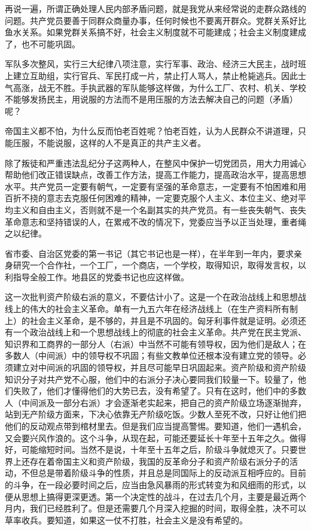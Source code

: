 再说一遍，所谓正确处理人民内部矛盾问题，就是我党从来经常说的走群众路线的问题。共产党员要善于同群众商量办事，任何时候也不要离开群众。党群关系好比鱼水关系。如果党群关系搞不好，社会主义制度就不可能建成；社会主义制度建成了，也不可能巩固。

军队多次整风，实行三大纪律八项注意，实行军事、政治、经济三大民主，战时班上建立互助组，实行官兵、军民打成一片，禁止打人骂人，禁止枪毙逃兵。因此士气高涨，战无不胜。手执武器的军队能够这样做，为什么工厂、农村、机关、学校不能够发扬民主，用说服的方法而不是用压服的方法去解决自己的问题（矛盾）呢？

帝国主义都不怕，为什么反而怕老百姓呢？怕老百姓，认为人民群众不讲道理，只能压服，不能说服，这样的人不是真正的共产主义者。

除了叛徒和严重违法乱纪分子这两种人，在整风中保护一切党团员，用大力用诚心帮助他们改正错误缺点，改善工作方法，提高工作能力，提高政治水平，提高思想水平。共产党员一定要有朝气，一定要有坚强的革命意志，一定要有不怕困难和用百折不挠的意志去克服任何困难的精神，一定要克服个人主义、本位主义、绝对平均主义和自由主义，否则就不是一个名副其实的共产党员。有一些丧失朝气、丧失革命意志和坚持错误的人，在累戒不改的情况下，党委应当予以正当处理，重者绳之以纪律。

省市委、自治区党委的第一书记（其它书记也是一样），在半年到一年内，要求亲身研究一个合作社，一个工厂，一个商店，一个学校，取得知识，取得发言权，以利指导全般工作。地县区的党委书记也应这样做。

这一次批判资产阶级右派的意义，不要估计小了。这是一个在政治战线上和思想战线上的伟大的社会主义革命。单有一九五六年在经济战线上（在生产资料所有制上）的社会主义革命，是不够的，并且是不巩固的。匈牙利事件就是证明。必须还有一个政治战线上和一个思想战线上的彻底的社会主义革命。共产党在民主党派、知识界和工商界的一部分人（右派）中当然不可能有领导权，因为他们是敌人；在多数人（中间派）中的领导权不巩固；有些文教单位还根本没有建立党的领导。必须建立对中间派的巩固的领导权，并且尽可能早日巩固起来。资产阶级和资产阶级知识分子对共产党不心服，他们中的右派分子决心要同我们较量一下。较量了，他们失败了，他们才懂得他们的大势已去，没有希望了。只有在这时，他们中的多数人（中间派及一部分右派）才会逐渐老实起来，把自己的资产阶级立场逐渐抛弃，站到无产阶级方面来，下决心依靠无产阶级吃饭。少数人至死不改，只好让他们把他们的反动观点带到棺材里去。但是我们应当提高警惕。要知道，他们一遇机会，又会要兴风作浪的。这个斗争，从现在起，可能还要延长十年至十五年之久。做得好，可能缩短时间。当然不是说，十年至十五年之后，阶级斗争就熄灭了。只要世界上还存在着帝国主义和资产阶级，我国的反革命分子和资产阶级右派分子的活动，不但总是带着阶级斗争的性质，并且总是同国际上的反动派互相呼应的。目前的斗争，在一段必要时间之后，应当由急风暴雨的形式转变为和风细雨的形式，以便从思想上搞得更深更透。第一个决定性的战斗，在过去几个月，主要是最近两个月内，我们已经胜利了。但是还需要几个月深入挖掘的时间，取得全胜，决不可以草率收兵。要知道，如果这一仗不打胜，社会主义是没有希望的。

